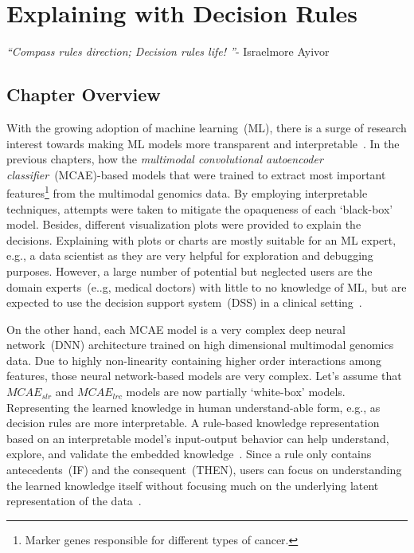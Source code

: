 \chapter{Explaining with Decision Rules}\label{chapter:xai_rules}
\textit{``Compass rules direction; Decision rules life! ''}- Israelmore Ayivor

\section{Chapter Overview} \label{chapter_7:cw}
With the growing adoption of machine learning~(ML), there is a surge of research interest towards making ML models more transparent and interpretable~\cite{ming2018rulematrix}. In the previous chapters, how the \textit{multimodal convolutional autoencoder classifier}~(MCAE)-based models that were trained to extract most important features\footnote{Marker genes responsible for different types of cancer.} from the multimodal genomics data. By employing interpretable techniques, attempts were taken to mitigate the opaqueness of each `black-box' model.
Besides, different visualization plots were provided to explain the decisions. Explaining with plots or charts are mostly suitable for an ML expert, e.g., a data scientist as they are very helpful for exploration and debugging purposes. However, a large number of potential but neglected users are the domain experts~(e..g, medical doctors) with little to no knowledge of ML, but are expected to use the decision support system~(DSS) in a clinical setting~\cite{ming2018rulematrix}.


\hspace*{3.5mm} On the other hand, each MCAE model is a very complex deep neural network~(DNN) architecture trained on high dimensional multimodal genomics data. Due to highly non-linearity containing higher order interactions among features, those neural network-based models are very complex. Let's assume that $MCAE_{slr}$ and $MCAE_{lrc}$ models are now partially `white-box' models. Representing the learned knowledge in human understand-able form, e.g., as decision rules are more interpretable. A rule-based knowledge representation based on an interpretable model's input-output behavior can help understand, explore, and validate the embedded knowledge~\cite{ming2018rulematrix}. Since a rule only contains antecedents~(IF) and the consequent~(THEN), users can focus on understanding the learned knowledge itself without focusing much on the underlying latent representation of the data~\cite{ming2018rulematrix}. 


